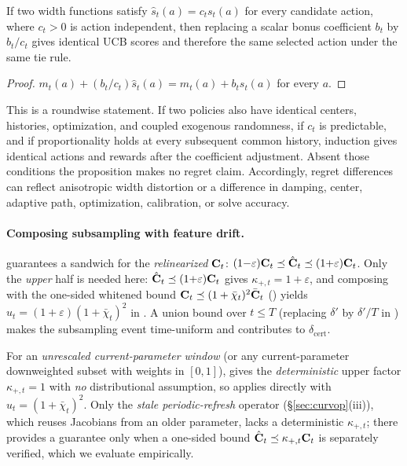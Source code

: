 \documentclass[twoside]{article}
\begin{document}
\begin{proposition}\label{prop:scalar-invariance}
If two width functions satisfy $\hat s_t(a)=c_ts_t(a)$ for every candidate
action, where $c_t>0$ is action independent, then replacing a scalar bonus
coefficient $b_t$ by $b_t/c_t$ gives identical UCB scores and therefore the
same selected action under the same tie rule.
\end{proposition}
\begin{proof}
$m_t(a)+(b_t/c_t)\hat s_t(a)=m_t(a)+b_ts_t(a)$ for every $a$.
\end{proof}
This is a roundwise statement.  If two policies also have identical centers,
histories, optimization, and coupled exogenous randomness, if $c_t$ is
predictable, and if proportionality holds at every subsequent common history,
induction gives identical actions and rewards after the coefficient adjustment.
Absent those conditions the proposition makes no regret claim.  Accordingly,
regret differences can reflect anisotropic width distortion or a difference in
damping, center, adaptive path, optimization, calibration, or solve accuracy.

\paragraph{Composing subsampling with feature drift.}
 guarantees a sandwich for the \emph{relinearized}
$\mathbf{C}_t$: $(1{-}\varepsilon)\mathbf{C}_t\preceq\hat{\mathbf{C}}_t\preceq(1{+}\varepsilon)\mathbf{C}_t$.
Only the \emph{upper} half is needed here: $\hat{\mathbf{C}}_t\preceq(1{+}\varepsilon)\mathbf{C}_t$
gives $\kappa_{+,t}=1+\varepsilon$, and composing with the one-sided
whitened bound $\mathbf{C}_t\preceq(1+\bar\chi_t)^2\bar{\mathbf{C}}_t$ ()
yields $u_t=(1+\varepsilon)(1+\bar\chi_t)^2$ in
.  A union bound over $t\le T$ (replacing
$\delta'$ by $\delta'/T$ in ) makes the subsampling
event time-uniform and contributes to $\delta_{\mathrm{cert}}$.

For an \emph{unrescaled current-parameter window} (or any current-parameter
downweighted subset with weights in $[0,1]$),  gives the
\emph{deterministic} upper factor $\kappa_{+,t}=1$ with \emph{no} distributional
assumption, so  applies directly with
$u_t=(1+\bar\chi_t)^2$.  Only the \emph{stale periodic-refresh} operator
(\S\ref{sec:curvop}(iii)), which reuses Jacobians from an older parameter, lacks
a deterministic $\kappa_{+,t}$; there  provides a
guarantee only when a one-sided bound $\hat{\mathbf{C}}_t\preceq\kappa_{+,t}\mathbf{C}_t$ is
separately verified, which we evaluate empirically.
\end{document}
